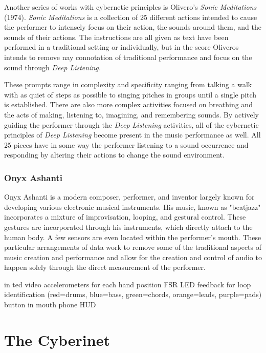 Another series of works with cybernetic principles is Olivero's \textit{Sonic Meditations} (1974). \textit{Sonic Meditations} is a collection of 25 different actions intended to cause the performer to intensely focus on their action, the sounds around them, and the sounds of their actions\cite{OliverosMeditations}. The instructions are all given as text have been performed in a traditional setting or individually, but in the score Oliveros intends to remove nay connotation of traditional performance and focus on the sound through \textit{Deep Listening.} 

These prompts range in complexity and specificity ranging from talking a walk with as quiet of steps as possible to singing pitches in groups until a single pitch is established. There are also more complex activities focused on breathing and the acts of making, listening to, imagining, and remembering sounds\cite{OliverosMeditations}. By actively guiding the performer through the \textit{Deep Listening} activities, all of the cybernetic principles of \textit{Deep Listening} become present in the music performance as well. All 25 pieces have in some way the performer listening to a sound occurrence and responding by altering their actions to change the sound environment.

\subsubsection{Onyx Ashanti} %
Onyx Ashanti is a modern composer, performer, and inventor largely known for developing various electronic musical instruments. His music, known as "beatjazz" incorporates a mixture of improvisation, looping, and gestural control. These gestures are incorporated through his instruments, which directly attach to the human body. A few sensors are even located within the performer's mouth. These particular arrangements of data work to remove some of the traditional aspects of music creation and performance and allow for the creation and control of audio to happen solely through the direct measurement of the performer.

in ted video
accelerometers for each hand position
FSR
LED feedback for loop identification (red=drums, blue=bass, green=chords, orange=leads, purple=pads)
button in mouth
phone HUD 


\section{The Cyberinet}


